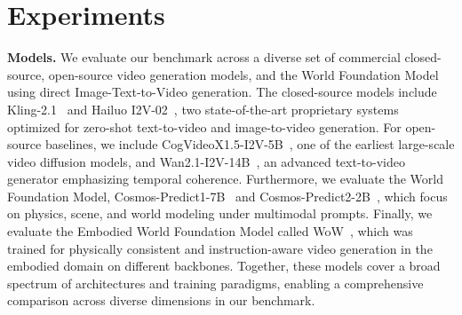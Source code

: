 \section{Experiments}
\label{sec:experiments}
\textbf{Models.} We evaluate our benchmark across a diverse set of commercial closed-source, open-source video generation models, and the World Foundation Model using direct Image-Text-to-Video generation. The closed-source models include Kling-2.1~\cite{Kling} and Hailuo I2V-02~\cite{Hailuo}, two state-of-the-art proprietary systems optimized for zero-shot text-to-video and image-to-video generation. For open-source baselines, we include CogVideoX1.5-I2V-5B~\cite{yang2024cogvideox}, one of the earliest large-scale video diffusion models, and Wan2.1-I2V-14B~\cite{wan2025wan}, an advanced text-to-video generator emphasizing temporal coherence. Furthermore, we evaluate the World Foundation Model, Cosmos-Predict1-7B~\cite{agarwal2025cosmos} and Cosmos-Predict2-2B~\cite{cosmos2}, which focus on physics, scene, and world modeling under multimodal prompts. Finally, we evaluate the Embodied World Foundation Model called WoW~\cite{chi2025wow}, which was trained for physically consistent and instruction-aware video generation in the embodied domain on different backbones. Together, these models cover a broad spectrum of architectures and training paradigms, enabling a comprehensive comparison across diverse dimensions in our benchmark.


